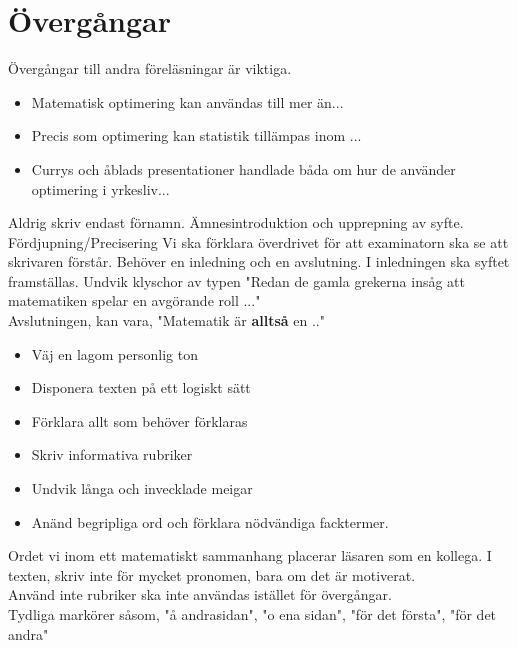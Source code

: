 \section{Övergångar}
Övergångar till andra föreläsningar är viktiga.\\
\begin{itemize}
	\item Matematisk optimering kan användas till mer än...
	\item Precis som optimering kan statistik tillämpas inom ...
	\item Currys och åblads presentationer handlade båda om hur de använder optimering i yrkesliv...
\end{itemize}
Aldrig skriv endast förnamn.
Ämnesintroduktion och upprepning av syfte.
Fördjupning/Precisering
Vi ska förklara överdrivet för att examinatorn ska se att skrivaren förstår.
Behöver en inledning och en avslutning.
I inledningen ska syftet framställas. Undvik klyschor av typen "Redan de gamla grekerna insåg att matematiken spelar en avgörande roll ..."\\
Avslutningen, kan vara, "Matematik är \textbf{alltså} en .."
\begin{itemize}
	\item Väj en lagom personlig ton
	\item Disponera texten på ett logiskt sätt
	\item Förklara allt som behöver förklaras
	\item Skriv informativa rubriker
	\item Undvik långa och invecklade meigar
	\item Anänd begripliga ord och förklara nödvändiga facktermer.
\end{itemize}
Ordet vi inom ett matematiskt sammanhang placerar läsaren som en kollega.
I texten, skriv inte för mycket pronomen, bara om det är motiverat.\\
Använd inte rubriker ska inte användas istället för övergångar.\\
Tydliga markörer såsom, "å andrasidan", "o ena sidan", "för det första", "för det andra"